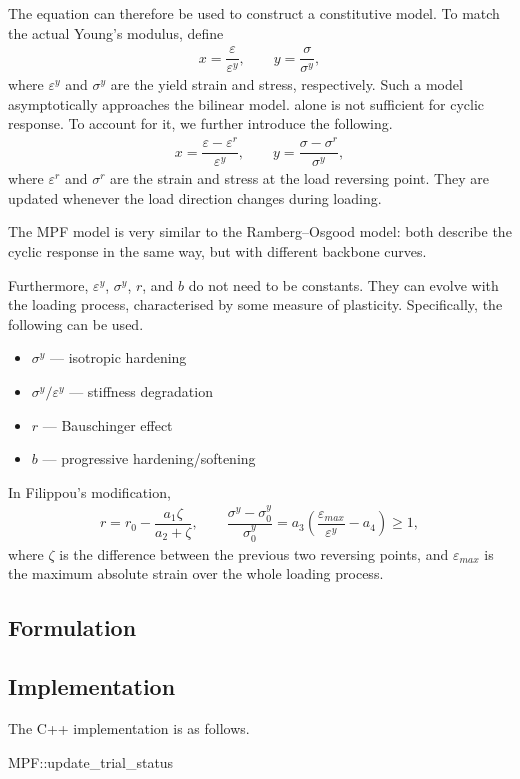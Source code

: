 The equation can therefore be used to construct a constitutive model.
To match the actual Young's modulus, define
\begin{gather}\label{eq:mpf_scaled}
	x=\dfrac{\varepsilon}{\varepsilon^y},\qquad
	y=\dfrac{\sigma}{\sigma^y},
\end{gather}
where $\varepsilon^y$ and $\sigma^y$ are the yield strain and stress, respectively.
Such a model asymptotically approaches the bilinear model.
 alone is not sufficient for cyclic response.
To account for it, we further introduce the following.
\begin{gather}
	x=\dfrac{\varepsilon-\varepsilon^r}{\varepsilon^y},\qquad
	y=\dfrac{\sigma-\sigma^r}{\sigma^y},
\end{gather}
where $\varepsilon^r$ and $\sigma^r$ are the strain and stress at the load reversing point.
They are updated whenever the load direction changes during loading.

The MPF model is very similar to the Ramberg--Osgood model: both describe the cyclic response in the same way, but with different backbone curves.

Furthermore, $\varepsilon^y$, $\sigma^y$, $r$, and $b$ do not need to be constants.
They can evolve with the loading process, characterised by some measure of plasticity.
Specifically, the following can be used.
\begin{itemize}
	\item $\sigma^y$ --- isotropic hardening
	\item $\sigma^y/\varepsilon^y$ --- stiffness degradation
	\item $r$ --- Bauschinger effect
	\item $b$ --- progressive hardening/softening
\end{itemize}

In Filippou's modification,
\begin{gather}
	r=r_0-\dfrac{a_1\zeta}{a_2+\zeta},\qquad
	\dfrac{\sigma^y-\sigma^y_0}{\sigma^y_0}=a_3\left(\dfrac{\varepsilon_{max}}{\varepsilon^y}-a_4\right)\geqslant1,
\end{gather}
where $\zeta$ is the difference between the previous two reversing points, and $\varepsilon_{max}$ is the maximum absolute strain over the whole loading process.
\subsection{Formulation}
\subsection{Implementation}
The C++ implementation is as follows.
\begin{cppcode}
MPF::update_trial_status
\end{cppcode}
